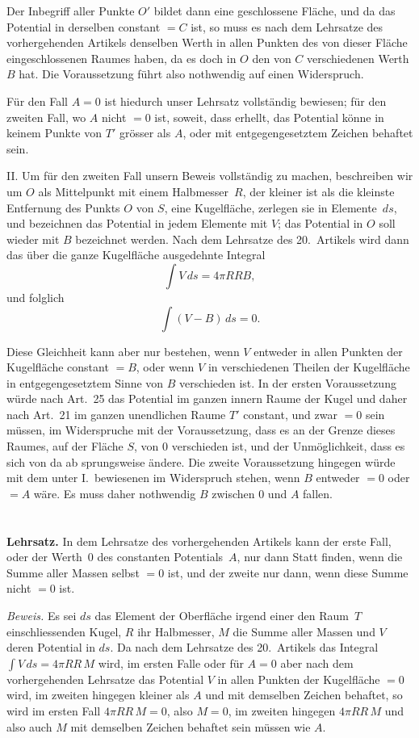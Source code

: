 \documentclass[12pt,a4paper]{article}
\begin{document}
Der Inbegriff aller Punkte $O'$ bildet dann eine geschlossene Fläche, und da das
Potential in derselben constant $=C$ ist, so muss es nach dem Lehrsatze des vorhergehenden
Artikels denselben Werth in allen Punkten des von dieser Fläche
eingeschlossenen Raumes haben, da es doch in $O$ den von $C$ verschiedenen Werth
$B$ hat. Die Voraussetzung führt also nothwendig auf einen Widerspruch.

Für den Fall $A=0$ ist hiedurch unser Lehrsatz vollständig bewiesen;
für den zweiten Fall, wo $A$ nicht $=0$ ist, soweit, dass erhellt, das Potential
könne in keinem Punkte von $T'$ grösser als $A$, oder mit entgegengesetztem
Zeichen behaftet sein.

II. Um für den zweiten Fall unsern Beweis vollständig zu machen, beschreiben
wir um $O$ als Mittelpunkt mit einem Halbmesser~$R$, der kleiner ist
als die kleinste Entfernung des Punkts $O$ von $S$, eine Kugelfläche, zerlegen sie
in Elemente~$ds$, und bezeichnen das Potential in jedem Elemente mit $V$; das
Potential in $O$ soll wieder mit $B$ bezeichnet werden. Nach dem Lehrsatze des
20.~Artikels wird dann das über die ganze Kugelfläche ausgedehnte Integral
\[
\int V\,ds = 4\pi RR B,
\]
und folglich
\[
\int(V-B)\,ds = 0.
\]

Diese Gleichheit kann aber nur bestehen, wenn $V$ entweder in allen Punkten
der Kugelfläche constant $=B$, oder wenn $V$ in verschiedenen Theilen der
Kugelfläche in entgegengesetztem Sinne von $B$ verschieden ist. In der ersten
Voraussetzung würde nach Art.~25 das Potential im ganzen innern Raume der Kugel
und daher nach Art.~21 im ganzen unendlichen Raume $T'$ constant, und zwar
$=0$ sein müssen, im Widerspruche mit der Voraussetzung, dass es an der Grenze
dieses Raumes, auf der Fläche $S$, von $0$ verschieden ist, und der Unmöglichkeit,
dass es sich von da ab sprungsweise ändere. Die zweite Voraussetzung hingegen
würde mit dem unter I.\ bewiesenen im Widerspruch stehen, wenn $B$ entweder
$=0$ oder $=A$ wäre. Es muss daher nothwendig $B$ zwischen $0$ und $A$ fallen.

\section{}
\textbf{Lehrsatz.} In dem Lehrsatze des vorhergehenden Artikels kann der erste
Fall, oder der Werth~$0$ des constanten Potentials~$A$, nur dann Statt finden,
wenn die Summe aller Massen selbst $=0$ ist, und der zweite nur dann, wenn
diese Summe nicht $=0$ ist.

\textit{Beweis.} Es sei $ds$ das Element der Oberfläche irgend einer den Raum~$T$
einschliessenden Kugel, $R$ ihr Halbmesser, $M$ die Summe aller Massen und $V$
deren Potential in $ds$. Da nach dem Lehrsatze des 20.~Artikels das Integral
$\int V\,ds = 4\pi RR\,M$ wird, im ersten Falle oder für $A=0$ aber nach dem vorhergehenden
Lehrsatze das Potential $V$ in allen Punkten der Kugelfläche $=0$ wird,
im zweiten hingegen kleiner als $A$ und mit demselben Zeichen behaftet, so wird
im ersten Fall $4\pi RR\,M=0$, also $M=0$, im zweiten hingegen $4\pi RR\,M$
und also auch $M$ mit demselben Zeichen behaftet sein müssen wie $A$.
\end{document}
